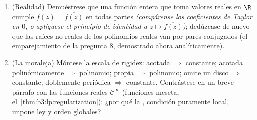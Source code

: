 \begin{problem}
\begin{enumerate}[resume]
        \cref{ch:b3:residues}.
  \item (Realidad) Demuéstrese que una función entera que toma valores
  reales en $\R$ cumple $f(\bar z) =
        \overline{f(z)}$ en todas partes \emph{(compárense los
  coeficientes de Taylor en $0$, o aplíquese el principio de identidad a
  $z \mapsto \overline{f(\bar z)}$)}; dedúzcase de nuevo que las raíces
  no reales de los polinomios reales van por pares conjugados (el
  emparejamiento de la pregunta 8, demostrado ahora analíticamente).
  \item (La moraleja) Móntese la escala de rigidez: acotada
  $\Rightarrow$ constante; acotada polinómicamente $\Rightarrow$
  polinomio; propia $\Rightarrow$ polinomio; omite un disco
  $\Rightarrow$ constante; doblemente periódica $\Rightarrow$ constante.
  Contrástese en un breve párrafo con las funciones reales
  $\mathcal C^\infty$ (funciones meseta,
  el~\cref{thm:b3:lp:regularization}): ¿por qué la
  , condición puramente
  local, impone ley y orden globales?
\end{enumerate}


\end{problem}
